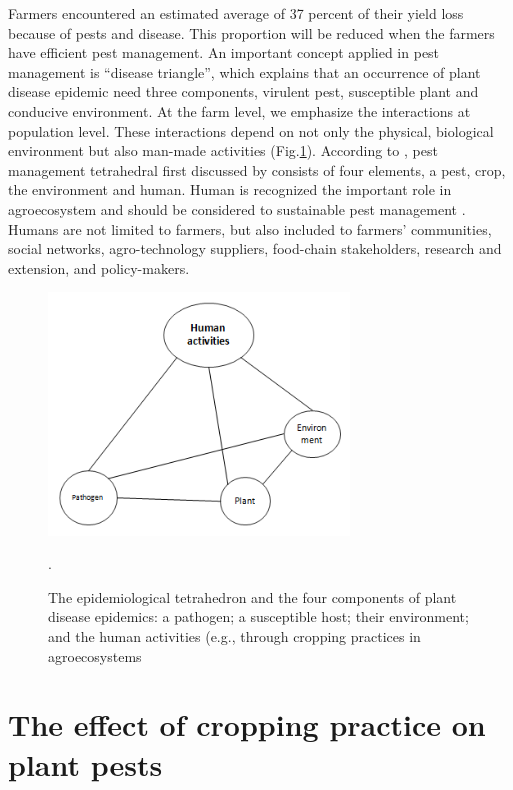 \documentclass[12pt, oneside]{report}
\begin{document}
Farmers encountered an estimated average of 37 percent of their yield loss because of pests and disease. This proportion will be reduced when the farmers have efficient pest management. An important concept applied in pest management is ``disease triangle'', which explains that an occurrence of plant disease epidemic need three components, virulent pest, susceptible plant and conducive environment. At the farm level, we emphasize the interactions at population level. These interactions depend on not only the physical, biological environment but also man-made activities (Fig.\ref{fig:diseasetriangle}). According to \citet{Savary:2006to}, pest management tetrahedral first discussed by \cite{Zadoks:1979ts} consists of four elements, a pest, crop, the environment and human. Human is recognized the important role in agroecosystem and should be considered to sustainable pest management \citep{Zadok1985}. Humans are not limited to farmers, but also included to farmers' communities, social networks, agro-technology suppliers, food-chain stakeholders, research and extension, and policy-makers. 

\begin{figure}
\includegraphics[width=8cm]{distriangle}
\centering
\caption{The epidemiological tetrahedron and the four components of plant disease epidemics: a pathogen; a susceptible host; their environment; and the human activities (e.g., through cropping practices in agroecosystems}.
\label{fig:diseasetriangle}
\end{figure}

\section*{The effect of cropping practice on plant pests}
\end{document}
